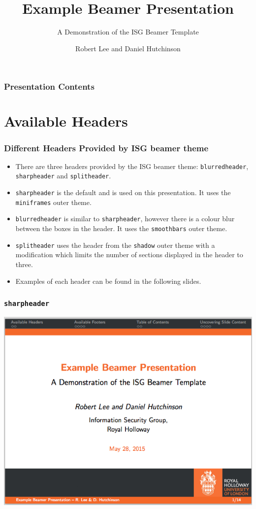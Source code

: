 \documentclass{beamer}
\title{Example Beamer Presentation}
\subtitle{A Demonstration of the ISG Beamer Template}
\author[R. Lee \& D. Hutchinson]{Robert Lee and Daniel Hutchinson}
\institute{Information Security Group,\\
Royal Holloway}
\begin{document}
\begin{frame}
	\titlepage
\end{frame}

\begin{frame}\frametitle{Presentation Contents}
	\tableofcontents
\end{frame}

\section{Available Headers}
\begin{frame}\frametitle{Different Headers Provided by ISG beamer theme}
\begin{itemize}
	\item There are three headers provided by the ISG beamer theme: \texttt{blurredheader}, \texttt{sharpheader} and \texttt{splitheader}.
	\item \texttt{sharpheader} is the default and is used on this presentation. It uses the \texttt{miniframes} outer theme.
	\item \texttt{blurredheader} is similar to \texttt{sharpheader}, however there is a colour blur between the boxes in the header.  It uses the \texttt{smoothbars} outer theme.
	\item \texttt{splitheader} uses the header from the \texttt{shadow} outer theme with a modification which limits the number of sections displayed in the header to three.
	\item Examples of each header can be found in the following slides.
\end{itemize}
\end{frame}

\begin{frame}\frametitle{\texttt{sharpheader}}
\begin{center}
	\includegraphics[scale=0.4]{graphics/sharpheader.png}
\end{center}
\end{frame}
\end{document}
